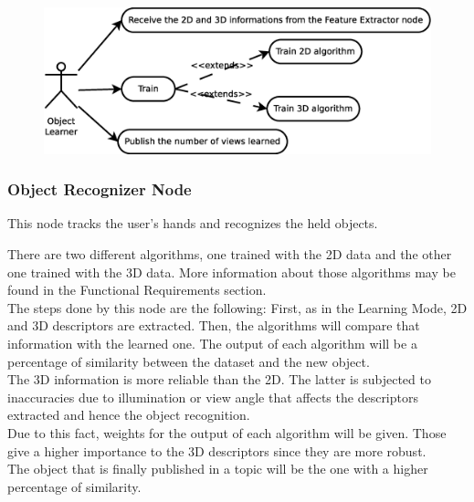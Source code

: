 \documentclass{article}
\begin{document}
\begin{figure}[H]
\begin{center}

		\includegraphics[scale=0.4]{../../img/diagrams/uc_learner.eps}
	\end{center}
\end{figure}

\subsubsection{Object Recognizer Node} 
\hspace{0.5cm}This node tracks the user's hands and recognizes the held objects. 

There are two different algorithms, one trained with the 2D data and the other one trained with the 3D data. More information about those algorithms may be found in the Functional Requirements section. 
\\
The steps done by this node are the following: 
First, as in the Learning Mode, 2D and 3D descriptors are extracted. Then, the algorithms will compare that information with the learned one. 
The output of each algorithm will be a percentage of similarity between the dataset and the new object. 
\\
The 3D information is more reliable than the 2D. The latter is subjected to inaccuracies due to illumination or view angle that affects the descriptors extracted and hence the object recognition.
\\
Due to this fact, weights for the output of each algorithm will be given. Those give a higher importance to the 3D descriptors since they are more robust. 
\\
The object that is finally published in a topic will be the one with a higher percentage of similarity. 
\end{document}
